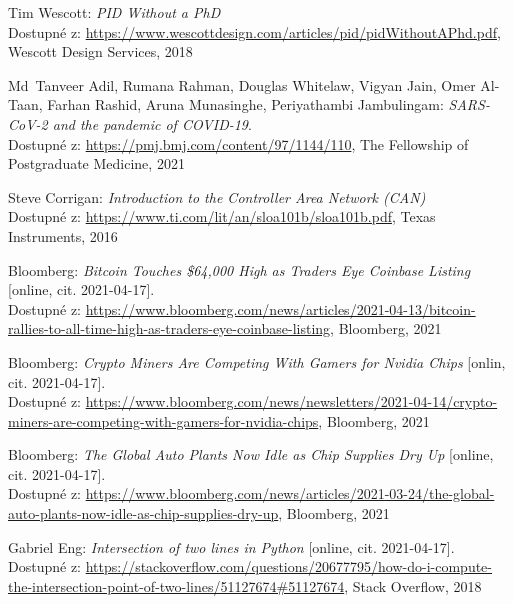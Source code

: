 \documentclass[czech, bachelor]{diploma}
\begin{document}
\renewcommand{\bibname}{Zdroje}
\begin{thebibliography}{50}

Tim Wescott: \textit{PID Without a PhD} \\
Dostupné z: \url{https://www.wescottdesign.com/articles/pid/pidWithoutAPhd.pdf},
Wescott Design Services, 2018

Md~Tanveer Adil, Rumana Rahman, Douglas Whitelaw, Vigyan Jain, Omer Al-Taan, Farhan Rashid, Aruna Munasinghe,
Periyathambi Jambulingam: \textit{SARS-CoV-2 and the pandemic of COVID-19}. \\
Dostupné z: \url{https://pmj.bmj.com/content/97/1144/110},
The Fellowship of Postgraduate Medicine, 2021

Steve Corrigan: \textit{Introduction to the Controller Area Network (CAN)} \\
Dostupné z: \url{https://www.ti.com/lit/an/sloa101b/sloa101b.pdf},
Texas Instruments, 2016

Bloomberg: \textit{Bitcoin Touches \$64,000 High as Traders Eye Coinbase Listing} [online, cit. 2021-04-17]. \\
Dostupné z:
\url{https://www.bloomberg.com/news/articles/2021-04-13/bitcoin-rallies-to-all-time-high-as-traders-eye-coinbase-listing},
Bloomberg, 2021

Bloomberg: \textit{Crypto Miners Are Competing With Gamers for Nvidia Chips} [onlin, cit. 2021-04-17]. \\
Dostupné z:
\url{https://www.bloomberg.com/news/newsletters/2021-04-14/crypto-miners-are-competing-with-gamers-for-nvidia-chips},
Bloomberg, 2021

Bloomberg: \textit{The Global Auto Plants Now Idle as Chip Supplies Dry Up} [online, cit. 2021-04-17]. \\
Dostupné z:
\url{https://www.bloomberg.com/news/articles/2021-03-24/the-global-auto-plants-now-idle-as-chip-supplies-dry-up},
Bloomberg, 2021

Gabriel Eng: \textit{Intersection of two lines in Python} [online, cit. 2021-04-17]. \\
Dostupné z:
\url{https://stackoverflow.com/questions/20677795/how-do-i-compute-the-intersection-point-of-two-lines/51127674\#51127674},
Stack Overflow, 2018


\end{thebibliography}
\end{document}
